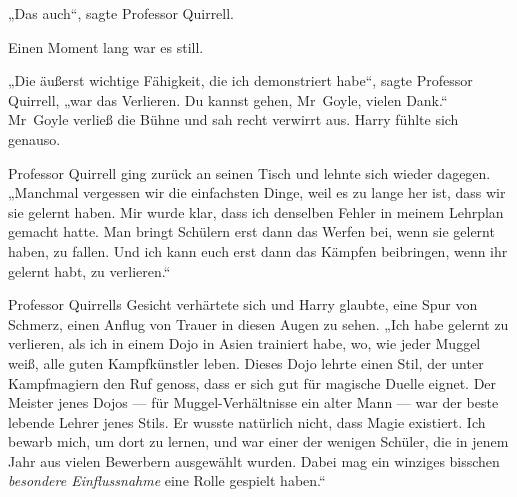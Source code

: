 „Das auch“, sagte Professor Quirrell.

Einen Moment lang war es still.

„Die äußerst wichtige Fähigkeit, die ich demonstriert habe“, sagte Professor Quirrell, „war das Verlieren. Du kannst gehen, Mr~Goyle, vielen Dank.“
Mr~Goyle verließ die Bühne und sah recht verwirrt aus. Harry fühlte sich genauso.

Professor Quirrell ging zurück an seinen Tisch und lehnte sich wieder dagegen.
„Manchmal vergessen wir die einfachsten Dinge, weil es zu lange her ist, dass wir sie gelernt haben. Mir wurde klar, dass ich denselben Fehler in meinem Lehrplan gemacht hatte. Man bringt Schülern erst dann das Werfen bei, wenn sie gelernt haben, zu fallen. Und ich kann euch erst dann das Kämpfen beibringen, wenn ihr gelernt habt, zu verlieren.“

Professor Quirrells Gesicht verhärtete sich und Harry glaubte, eine Spur von Schmerz, einen Anflug von Trauer in diesen Augen zu sehen.
„Ich habe gelernt zu verlieren, als ich in einem Dojo in Asien trainiert habe, wo, wie jeder Muggel weiß, alle guten Kampfkünstler leben. Dieses Dojo lehrte einen Stil, der unter Kampfmagiern den Ruf genoss, dass er sich gut für magische Duelle eignet. Der Meister jenes Dojos — für Muggel-Verhältnisse ein alter Mann — war der beste lebende Lehrer jenes Stils. Er wusste natürlich nicht, dass Magie existiert. Ich bewarb mich, um dort zu lernen, und war einer der wenigen Schüler, die in jenem Jahr aus vielen Bewerbern ausgewählt wurden. Dabei mag ein winziges bisschen \emph{besondere Einflussnahme} eine Rolle gespielt haben.“

